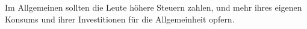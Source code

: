 Im Allgemeinen sollten die Leute höhere Steuern zahlen, und mehr ihres eigenen Konsums und ihrer Investitionen für die Allgemeinheit opfern.